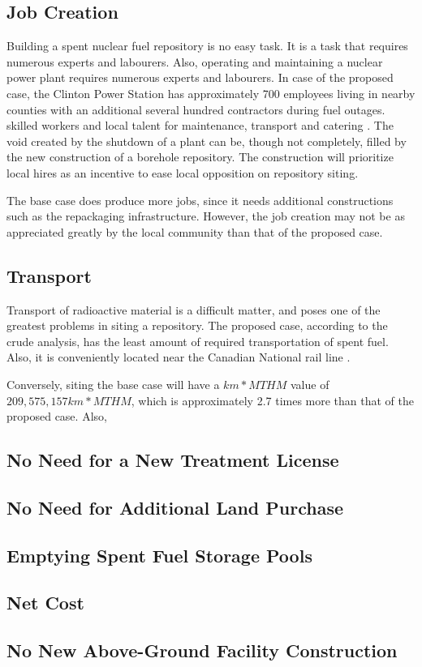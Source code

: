 \documentclass{anstrans}
\begin{document}
\subsection{Job Creation}

Building a spent nuclear fuel repository is no easy task. It is a task that requires
numerous experts and labourers. Also, operating and maintaining a nuclear power plant
requires numerous experts and labourers. In case of the proposed case, the Clinton
 Power Station has approximately 700 employees living in nearby counties with an
additional several hundred contractors during fuel outages.\cite{Exelon}
skilled workers and local talent for maintenance, transport and catering \cite{IAEA_2008}. The void created by the shutdown of a plant can be, though not
completely, filled by the new construction of a borehole repository. The construction
will prioritize local hires as an incentive to ease local opposition on repository siting. 

The base case does produce more jobs, since it needs additional constructions such
as the repackaging infrastructure. However, the job creation may not be as
appreciated greatly by the local community than that of the proposed case.


\subsection{Transport}
Transport of radioactive material is a difficult matter, and poses one of the greatest
problems in siting a repository. The proposed case, according to the crude analysis,
has the least amount of required transportation of spent fuel. Also, it is
conveniently located near the Canadian National rail line \cite{waleed_regional_2015}. 

Conversely, siting the base case will have a $km*MTHM$ value of $209,575,157 km*MTHM$, 
which is approximately 2.7 times more than that of the proposed case. Also, %

\subsection{No Need for a New Treatment License}

\subsection{No Need for Additional Land Purchase}

\subsection{Emptying Spent Fuel Storage Pools }

\subsection{ Net Cost}

\subsection{No New Above-Ground Facility Construction}






\end{document}
